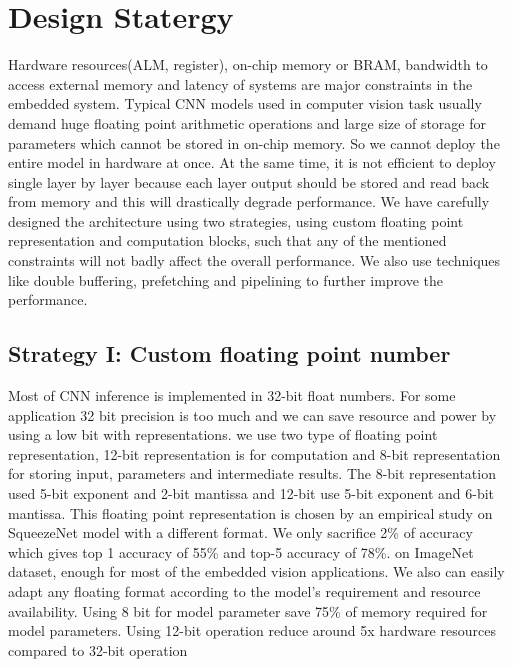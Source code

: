 \documentclass[conference]{IEEEtran}
\begin{document}
\section{Design Statergy}
Hardware resources(ALM, register), on-chip memory or BRAM, bandwidth to access external memory and latency of systems are major constraints in the embedded system. Typical CNN models used in computer vision task usually demand huge floating point arithmetic operations and large size of storage for parameters which cannot be stored in on-chip memory. So we cannot deploy the entire model in hardware at once. At the same time, it is not efficient to deploy single layer by layer because each layer output should be stored and read back from memory and this will drastically degrade performance. We have carefully designed the architecture using two strategies, using custom floating point representation and computation blocks, such that any of the mentioned constraints will not badly affect the overall performance.  We also use techniques like double buffering, prefetching and pipelining to further improve the performance.

\subsection{Strategy I: Custom floating point number
}\label{AA}
Most of CNN inference is implemented in 32-bit float numbers. For some application 32 bit precision is too much and we can save resource and power by using a low bit with representations. we use two type of floating point representation, 12-bit representation is for computation and 8-bit representation for storing input, parameters and intermediate results. The 8-bit representation used 5-bit exponent and 2-bit mantissa and 12-bit use 5-bit exponent and 6-bit mantissa. This floating point representation is chosen by an empirical study on SqueezeNet model with a different format. We only sacrifice 2\% of accuracy which gives top 1 accuracy of 55\% and top-5 accuracy of 78\%. on ImageNet dataset, enough for most of the embedded vision applications. We also can easily adapt any floating format according to the model’s requirement and resource availability. Using 8 bit for model parameter save 75\% of memory required for model parameters. Using 12-bit operation reduce around 5x hardware resources compared to 32-bit operation
\end{document}
